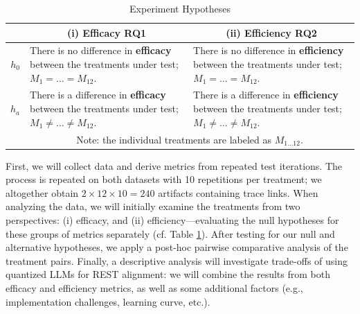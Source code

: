 \documentclass[conference]{IEEEtran}
\begin{document}
\newcommand{\equalM}{$M_{1} = \dots = M_{12}$}
\newcommand{\notEqualM}{$M_{1} \neq \dots \neq M_{12}$}

\begin{table}[h]
    \centering
    \caption{Experiment Hypotheses}
    \renewcommand{\arraystretch}{1.65} %
    \begin{tabular}{@{} c p{3.5cm} p{3.5cm} @{}}
    \toprule
    &\multicolumn{1}{c}{\textbf{(i) Efficacy RQ1}}
    &\multicolumn{1}{c}{\textbf{(ii) Efficiency RQ2}} \\  
    \midrule
    $h_{0}$ %
    & There is no difference in \textbf{efficacy} between the treatments
    under test; \equalM.
    & There is no difference in \textbf{efficiency} between the treatments
    under test; \equalM.\\
    $h_{a}$ %
    & There is a difference in \textbf{efficacy} between the treatments
    under test; \notEqualM.
    & There is a difference in \textbf{efficiency} between the treatments
    under test; \notEqualM.\\
    \bottomrule
    &\multicolumn{2}{c}{Note: the individual treatments are labeled as $M_{1\dots12}$.} \\
    \end{tabular}
    \label{tab:hypothesis}
\end{table}

First, we will collect data and derive metrics from repeated test iterations. The process is repeated on both datasets with 10 repetitions per treatment; we altogether obtain $2 \times 12 \times 10 = 240$ artifacts containing trace links. When analyzing the data, we will initially examine the treatments from two perspectives: (i) efficacy, and (ii) efficiency---evaluating the null hypotheses for these groups of metrics separately (cf. Table \ref{tab:hypothesis}). After testing for our null and alternative hypotheses, we apply a post-hoc pairwise comparative analysis of the treatment pairs. Finally, a descriptive analysis will investigate trade-offs of using quantized LLMs for REST alignment: we will combine the results from both efficacy and efficiency metrics, as well as some additional factors (e.g., implementation challenges, learning curve, etc.). 

\end{document}

